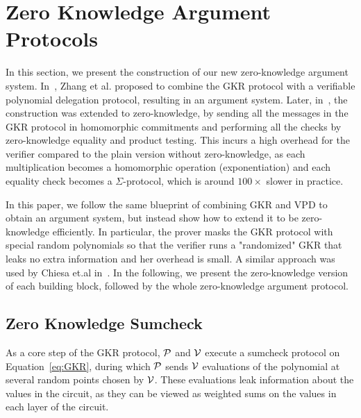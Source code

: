 
\section{Zero Knowledge Argument Protocols}\label{sec:zkp}

In this section, we present the construction of our new zero-knowledge argument system. In~\cite{zhang2017vsql}, Zhang et al. proposed to combine the GKR protocol with a verifiable polynomial delegation protocol, resulting in an argument system. Later, in~\cite{zkvpd,wahby2018doubly}, the construction was extended to zero-knowledge, by sending all the messages in the GKR protocol in homomorphic commitments and performing all the checks by zero-knowledge equality and product testing. This incurs a high overhead for the verifier compared to the plain version without zero-knowledge, as each multiplication becomes a homomorphic operation (exponentiation) and each equality check becomes a $\Sigma$-protocol, which is around $100\times$ slower in practice.

In this paper, we follow the same blueprint of combining GKR and VPD to obtain an argument system, but instead show how to extend it to be zero-knowledge efficiently. In particular, the prover masks the GKR protocol with special random polynomials so that the verifier runs a "randomized" GKR that leaks no extra information and her overhead is small. A similar approach was used by Chiesa et.al in~\cite{zksumcheck}. In the following, we present the zero-knowledge version of each building block, followed by the whole zero-knowledge argument protocol.

\subsection{Zero Knowledge Sumcheck}\label{subsec:zksumcheck}
As a core step of the GKR protocol, $\P$ and $\V$ execute a sumcheck protocol on Equation~\ref{eq:GKR}, during which $\P$ sends $\V$ evaluations of the polynomial at several random points chosen by $\V$. These evaluations leak information about the values in the circuit, as they can be viewed as weighted sums on the values in each layer of the circuit. 

